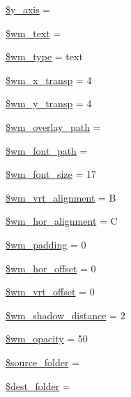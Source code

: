 \begin{DoxyCompactItemize}
\hyperlink{class_c_i___image__lib_ac60512307da37068c0821f7dc2488608}{\$y\+\_\+axis} = \textquotesingle{}\textquotesingle{}
\item 
\hyperlink{class_c_i___image__lib_a412eac22e8d585a33f28f132f13d482b}{\$wm\+\_\+text} = \textquotesingle{}\textquotesingle{}
\item 
\hyperlink{class_c_i___image__lib_a530808b613890909a92bf6096401e9be}{\$wm\+\_\+type} = \textquotesingle{}text\textquotesingle{}
\item 
\hyperlink{class_c_i___image__lib_a720496900551e5c29b11a732fb4f35ab}{\$wm\+\_\+x\+\_\+transp} = 4
\item 
\hyperlink{class_c_i___image__lib_aa9ab81b196739723a7c38d9431c9fa11}{\$wm\+\_\+y\+\_\+transp} = 4
\item 
\hyperlink{class_c_i___image__lib_a82ec5b8a6822dc7f9c70f4b5aafdebd4}{\$wm\+\_\+overlay\+\_\+path} = \textquotesingle{}\textquotesingle{}
\item 
\hyperlink{class_c_i___image__lib_a6870985f3e6bbf1a29e5875c054598f4}{\$wm\+\_\+font\+\_\+path} = \textquotesingle{}\textquotesingle{}
\item 
\hyperlink{class_c_i___image__lib_a0ea2a2f73623aa0631670017a4e68419}{\$wm\+\_\+font\+\_\+size} = 17
\item 
\hyperlink{class_c_i___image__lib_a1c52f46917a30e084db07a8c8e13af86}{\$wm\+\_\+vrt\+\_\+alignment} = \textquotesingle{}B\textquotesingle{}
\item 
\hyperlink{class_c_i___image__lib_a74d790b77baa0c22cd0b812abc41765c}{\$wm\+\_\+hor\+\_\+alignment} = \textquotesingle{}C\textquotesingle{}
\item 
\hyperlink{class_c_i___image__lib_ab1f63f5ae604d060dbc39653f6440826}{\$wm\+\_\+padding} = 0
\item 
\hyperlink{class_c_i___image__lib_aed778e3e9ecb74e8c61d8c4894581f7f}{\$wm\+\_\+hor\+\_\+offset} = 0
\item 
\hyperlink{class_c_i___image__lib_a577602650e0c67f9f4bfcdeda075fa50}{\$wm\+\_\+vrt\+\_\+offset} = 0
\item 
\hyperlink{class_c_i___image__lib_a3d5174ca66ce7149799b5830873aa747}{\$wm\+\_\+shadow\+\_\+distance} = 2
\item 
\hyperlink{class_c_i___image__lib_a9cc2d95dbcbb26a2f3f0c7416fc5920b}{\$wm\+\_\+opacity} = 50
\item 
\hyperlink{class_c_i___image__lib_a8fa5462b549251df178487f869c49800}{\$source\+\_\+folder} = \textquotesingle{}\textquotesingle{}
\item 
\hyperlink{class_c_i___image__lib_a23c580d10b1ba89c5b532f43fe2c6f59}{\$dest\+\_\+folder} = \textquotesingle{}\textquotesingle{}

\end{DoxyCompactItemize}
